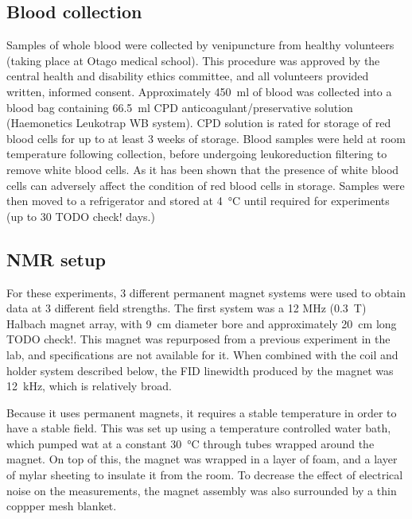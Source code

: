 \subsection{Blood collection}
Samples of whole blood were collected by venipuncture from healthy volunteers (taking place at Otago medical school).
This procedure was approved by the central health and disability ethics committee, and all volunteers provided written, informed consent.
Approximately \SI{450}{ml} of blood was collected into a blood bag containing \SI{66.5}{\milli\litre} CPD anticoagulant/preservative solution (Haemonetics Leukotrap WB system).
CPD solution is rated for storage of red blood cells for up to at least 3 weeks of storage\cite{Hessupdatesolutionsred2006}.
Blood samples were held at room temperature following collection, before undergoing leukoreduction filtering to remove white blood cells.
As it has been shown that the presence of white blood cells can adversely affect the condition of red blood cells in storage\cite{Hessupdatesolutionsred2006}.
Samples were then moved to a refrigerator and stored at \SI{4}{\degreeCelsius} until required for experiments (up to 30 TODO check! days.)

\subsection{NMR setup}
For these experiments, 3 different permanent magnet systems were used to obtain data at 3 different field strengths.
The first system was a 12 MHz (\SI{0.3}{T}) Halbach magnet array, with \SI{9}{cm} diameter bore and approximately \SI{20}{\centi\metre} long TODO check!.
This magnet was repurposed from a previous experiment in the lab, and specifications are not available for it.
When combined with the coil and holder system described below, the FID linewidth produced by the magnet was \SI{12}{\kilo\hertz}, which is relatively broad.

Because it uses permanent magnets, it requires a stable temperature in order to have a stable field.
This was set up using a temperature controlled water bath, which pumped wat at a constant \SI{30}{\celsius} through tubes wrapped around the magnet.
On top of this, the magnet was wrapped in a layer of foam, and a layer of mylar sheeting to insulate it from the room.
To decrease the effect of electrical noise on the measurements, the magnet assembly was also surrounded by a thin coppper mesh blanket.

